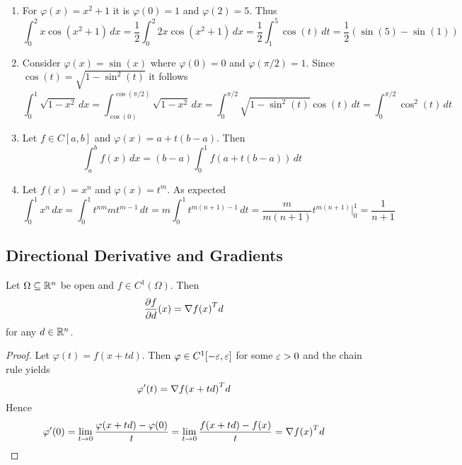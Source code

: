 \begin{examples}\hfill
    \begin{enumerate}
		\item For \( \varphi(x) = x^2 + 1 \) it is \( \varphi(0) = 1 \) and \( \varphi(2) = 5 \). Thus
			\[
				\int_0^2 x\cos(x^2 + 1)\,dx
					= \frac{1}{2} \int_0^2 2x\cos(x^2 + 1)\,dx
					= \frac{1}{2} \int_1^5 \cos(t)\,dt
					= \frac{1}{2} (\sin(5) - \sin(1))
			\]
		\item Consider \( \varphi(x) = \sin(x) \) where \( \varphi(0) = 0 \) and \( \varphi(\pi / 2) = 1 \).
			Since \( \cos(t) = \sqrt{1 - \sin^2(t)} \) it follows
			\[
				\int_0^1 \sqrt{1 - x^2}\,dx
					= \int_{\cos(0)}^{\cos(\pi/2)} \sqrt{1 - x^2}\,dx
					= \int_0^{\pi/2} \sqrt{1 - \sin^2(t)}\cos(t)\,dt
					= \int_0^{\pi/2} \cos^2(t)\,dt
			\]
		\item Let \(f \in C[a,b] \) and \( \varphi(x) = a + t(b - a) \). Then
			\[
				\int_a^b f(x)\,dx = (b - a)\int_0^1 f(a + t(b - a))\,dt
			\]
		\item Let \(f(x) = x^n \) and \( \varphi(x) = t^m \). As expected
			\[
				\int_0^1 x^n\,dx
					= \int_0^1 t^{nm} m t^{m - 1}\,dt
					= m\int_0^1 t^{m(n + 1) - 1}\,dt
					= \frac{m}{m(n + 1)} t^{m(n + 1)}\bigg|_0^1 
					= \frac{1}{n + 1}
			\]
    \end{enumerate}
\end{examples}
\bigskip


\subsection{Directional Derivative and Gradients}


\begin{lemma}\label{lemma:directional_derivative}
Let \( \Omega \subseteq \mathbb{R}^n \) be open and \( f \in C^1(\Omega) \). Then
\[
    \frac{\partial f}{\partial d}(x) = \nabla{f(x)}^T d
\]
for any \( d \in \mathbb{R}^n \).
\end{lemma}

\begin{proof}
Let \( \varphi(t) = f(x + td) \). Then \( \varphi \in C^1[-\varepsilon, \varepsilon ] \) for some \( \varepsilon > 0 \) 
and the chain rule yields 
\[ 
    \varphi'(t) = {\nabla f(x + td)}^T d 
\]
Hence
\[
    \varphi'(0) = \lim_{t \to 0} \frac{\varphi(x + td) - \varphi(0)}{t} = 
        \lim_{t \to 0} \frac{f(x + td) - f(x)}{t} = {\nabla f(x)}^T d
\]
\end{proof}
\bigskip

